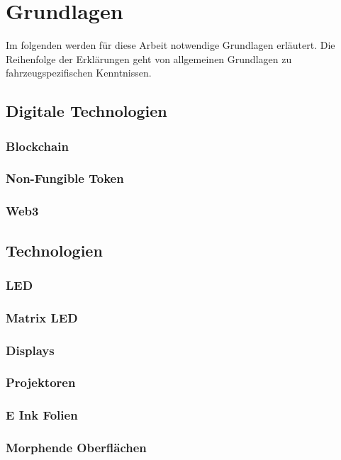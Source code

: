 \chapter{Grundlagen}
\label{cha:Grundlagen}

Im folgenden werden für diese Arbeit notwendige Grundlagen erläutert. Die Reihenfolge der Erklärungen geht von allgemeinen Grundlagen zu fahrzeugspezifischen Kenntnissen.
\section{Digitale Technologien}
\subsection{Blockchain}
\subsection{Non-Fungible Token}
\subsection{Web3}
\section{Technologien}
\subsection{LED}
\subsection{Matrix LED}
\subsection{Displays}
\subsection{Projektoren}
\subsection{E Ink Folien}
\subsection{Morphende Oberflächen}
